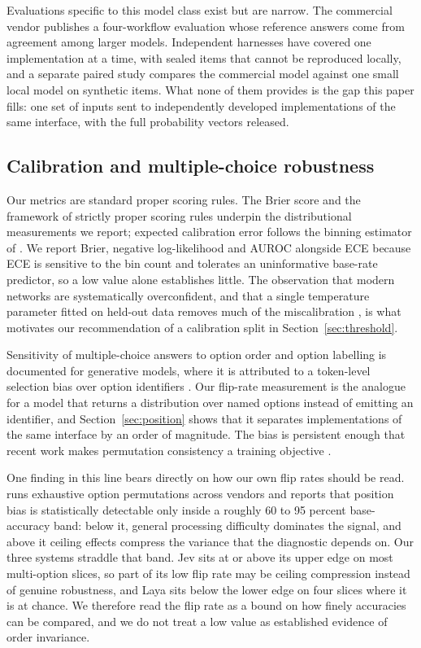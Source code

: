 Evaluations specific to this model class exist but are narrow. The commercial
vendor publishes a four-workflow evaluation whose reference answers come from
agreement among larger models. Independent harnesses have covered one
implementation at a time, with sealed items that cannot be reproduced locally, and
a separate paired study compares the commercial model against one small local
model on synthetic items. What none of them provides is the gap this paper fills:
one set of inputs sent to independently developed implementations of the same
interface, with the full probability vectors released.

\subsection{Calibration and multiple-choice robustness}

Our metrics are standard proper scoring rules. The Brier score
\citep{brier1950} and the framework of strictly proper scoring rules
\citep{gneiting2007scoring} underpin the distributional measurements we report;
expected calibration error follows the binning estimator of
\citet{naeini2015ece}. We report Brier, negative log-likelihood and AUROC
alongside ECE because ECE is sensitive to the bin count and tolerates an
uninformative base-rate predictor, so a low value alone establishes little. The
observation that modern networks are systematically overconfident, and that a
single temperature parameter fitted on held-out data removes much of the
miscalibration \citep{guo2017calibration}, is what motivates our recommendation
of a calibration split in Section~\ref{sec:threshold}.

Sensitivity of multiple-choice answers to option order and option labelling is
documented for generative models, where it is attributed to a token-level
selection bias over option identifiers \citep{zheng2024mcqbias}. Our flip-rate
measurement is the analogue for a model that returns a distribution over named
options instead of emitting an identifier, and Section~\ref{sec:position} shows
that it separates implementations of the same interface by an order of magnitude.
The bias is persistent enough that recent work makes permutation consistency a
training objective \citep{zheng2026pagrpo}.

One finding in this line bears directly on how our own flip rates should be read.
\citet{tamba2026positionbias} runs exhaustive option permutations across vendors
and reports that position bias is statistically detectable only inside a roughly
60 to 95 percent base-accuracy band: below it, general processing difficulty
dominates the signal, and above it ceiling effects compress the variance that the
diagnostic depends on. Our three systems straddle that band. Jev sits at or above
its upper edge on most multi-option slices, so part of its low flip rate may be
ceiling compression instead of genuine robustness, and Laya sits below the lower
edge on four slices where it is at chance. We therefore read the flip rate as a
bound on how finely accuracies can be compared, and we do not treat a low value
as established evidence of order invariance.
